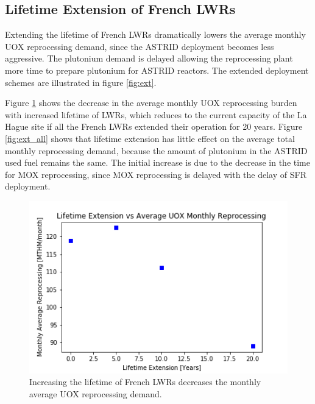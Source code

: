 \subsection{Lifetime Extension of French \glspl{LWR}}
Extending the lifetime of French \glspl{LWR} dramatically lowers the average
monthly \gls{UOX} reprocessing demand, since the \gls{ASTRID} deployment becomes less
aggressive. The plutonium demand is delayed allowing the reprocessing plant more
time to prepare plutonium for \gls{ASTRID} reactors. The
extended deployment schemes are illustrated in figure \ref{fig:ext}. 

Figure \ref{fig:ext_uox} shows the decrease in the average monthly
\gls{UOX} reprocessing burden with increased lifetime of \glspl{LWR},
which reduces to the current capacity of the La Hague site if all the
French \glspl{LWR} extended their operation for 20 years.
Figure \ref{fig:ext_all} shows that lifetime extension has little
effect on the average total monthly reprocessing demand, because
the amount of plutonium in the \gls{ASTRID} used fuel remains the same.
 The initial increase is due to the decrease in the time for \gls{MOX} 
 reprocessing, since \gls{MOX} reprocessing is delayed with the
  delay of \gls{SFR} deployment.
 
\begin{figure}[htbp!]
    \begin{center}
        \includegraphics[scale=0.6]{./images/sensitivity/ext_uox.png}
    \end{center}
    \caption{Increasing the lifetime of French \glspl{LWR} decreases the monthly
             average \gls{UOX} reprocessing demand.}
    \label{fig:ext_uox}
\end{figure}


